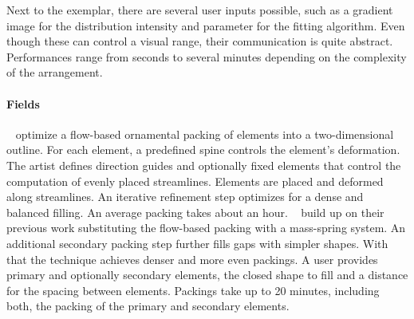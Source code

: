  Next to the exemplar, there are several user inputs possible, such as a gradient image for the distribution intensity and parameter for the fitting algorithm. Even though these can control a visual range, their communication is quite abstract. Performances range from seconds to several minutes depending on the complexity of the arrangement.


\paragraph*{Fields}
\label{para:analysis_element_arrangements_fields}

\citeauthor*{saputra_2017_ffo}~\cite{saputra_2017_ffo} optimize a flow-based ornamental packing of elements into a two-dimensional outline. For each element, a predefined spine controls the element's deformation. The artist defines direction guides and optionally fixed elements that control the computation of evenly placed streamlines. Elements are placed and deformed along streamlines. An iterative refinement step optimizes for a dense and balanced filling. An average packing takes about an hour. \citeauthor*{saputra_2018_rde}~\cite{saputra_2018_rde} build up on their previous work substituting the flow-based packing with a mass-spring system. An additional secondary packing step further fills gaps with simpler shapes. With that the technique achieves denser and more even packings. A user provides primary and optionally secondary elements, the closed shape to fill and a distance for the spacing between elements. Packings take up to 20 minutes, including both, the packing of the primary and secondary elements.

